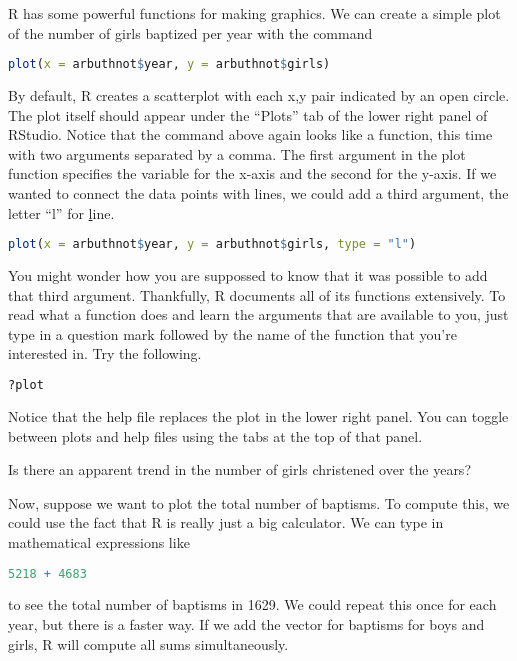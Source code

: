 \documentclass[11pt]{article}
\begin{document}
R has some powerful functions for making graphics. We can create a simple plot of the number of girls baptized per year with the command

\begin{lstlisting}[language=R]
plot(x = arbuthnot$year, y = arbuthnot$girls)
\end{lstlisting}


By default, R creates a scatterplot with each x,y pair indicated by an open circle. The plot itself should appear under the ``Plots'' tab of the lower right panel of RStudio. Notice that the command above again looks like a function, this time with two arguments separated by a comma.  The first argument in the plot function specifies the variable for the x-axis and the second for the y-axis. If we wanted to connect the data points with lines, we could add a third argument, the letter ``l'' for \underline{l}ine.

\begin{lstlisting}[language=R]
plot(x = arbuthnot$year, y = arbuthnot$girls, type = "l")
\end{lstlisting}

You might wonder how you are suppossed to know that it was possible to add that third argument.  Thankfully, R documents all of its functions extensively. To read what a function does and learn the arguments that are available to you, just type in a question mark followed by the name of the function that you're interested in. Try the following.

\begin{lstlisting}[language=R]
?plot
\end{lstlisting}

Notice that the help file replaces the plot  in the lower right panel.  You can toggle between plots and help files using the tabs at the top of that panel.

\begin{exercise}
Is there an apparent trend in the number of girls christened over the years?
\end{exercise}

Now, suppose we want to plot the total number of baptisms.  To compute this, we could use the fact that R is really just a big calculator. We can type in mathematical expressions like

\begin{lstlisting}[language=R]
5218 + 4683
\end{lstlisting}

to see the total number of baptisms in 1629. We could repeat this once for each year, but there is a faster way. If we add the vector for baptisms for boys and girls, R will compute all sums simultaneously.
\end{document}
